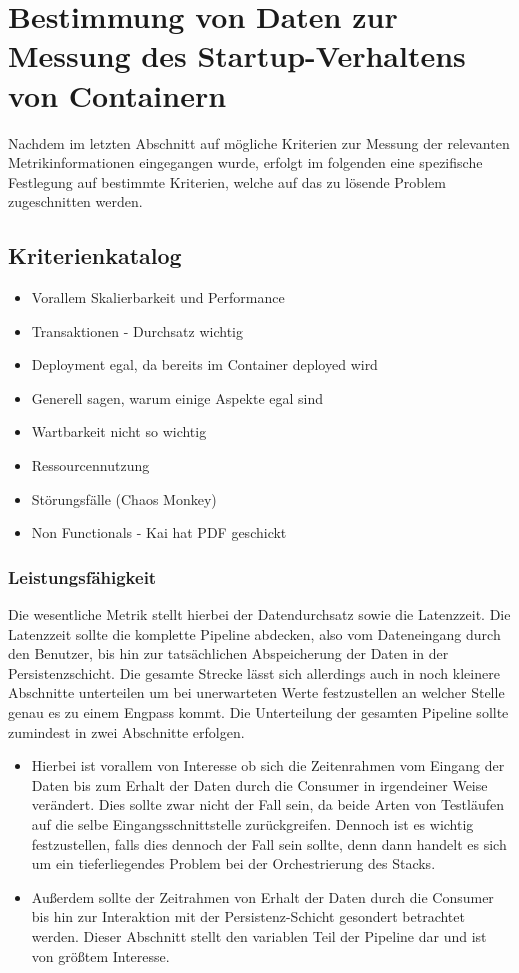 \section{Bestimmung von Daten zur Messung des Startup-Verhaltens von Containern}

Nachdem im letzten Abschnitt auf mögliche Kriterien zur Messung der relevanten Metrikinformationen eingegangen wurde, erfolgt im folgenden eine spezifische Festlegung auf bestimmte Kriterien, welche auf das zu lösende Problem zugeschnitten werden.

\subsection{Kriterienkatalog}
\begin{itemize}
  \item Vorallem Skalierbarkeit und Performance
  \item Transaktionen - Durchsatz wichtig
  \item Deployment egal, da bereits im Container deployed wird
  \item Generell sagen, warum einige Aspekte egal sind
  \item Wartbarkeit nicht so wichtig
  \item Ressourcennutzung
  \item St\"orungsf\"alle (Chaos Monkey)
  \item Non Functionals - Kai hat PDF geschickt
\end{itemize}

\subsubsection{Leistungsfähigkeit}
Die wesentliche Metrik stellt hierbei der Datendurchsatz sowie die Latenzzeit. Die Latenzzeit sollte die komplette Pipeline abdecken, also vom Dateneingang durch den Benutzer, bis hin zur tatsächlichen Abspeicherung der Daten in der Persistenzschicht. Die gesamte Strecke lässt sich allerdings auch in noch kleinere Abschnitte unterteilen um bei unerwarteten Werte festzustellen an welcher Stelle genau es zu einem Engpass kommt. Die Unterteilung der gesamten Pipeline sollte zumindest in zwei Abschnitte erfolgen.

\begin{itemize}
  \item Hierbei ist vorallem von Interesse ob sich die Zeitenrahmen vom Eingang der Daten bis zum Erhalt der Daten durch die Consumer in irgendeiner Weise verändert. Dies sollte zwar nicht der Fall sein, da beide Arten von Testläufen auf die selbe Eingangsschnittstelle zurückgreifen. Dennoch ist es wichtig festzustellen, falls dies dennoch der Fall sein sollte, denn dann handelt es sich um ein tieferliegendes Problem bei der Orchestrierung des Stacks.
  \item Außerdem sollte der Zeitrahmen von Erhalt der Daten durch die Consumer bis hin zur Interaktion mit der Persistenz-Schicht gesondert betrachtet werden. Dieser Abschnitt stellt den variablen Teil der Pipeline dar und ist von größtem Interesse. 
\end{itemize}

